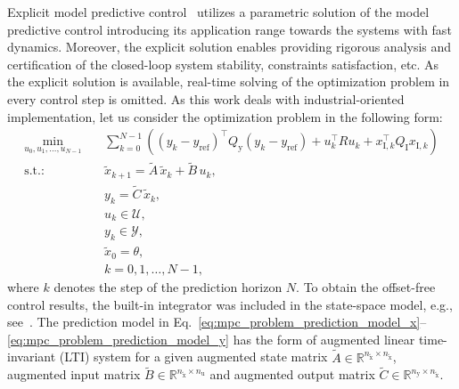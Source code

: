 \documentclass[preprint,12pt]{elsarticle}
\begin{document}
	Explicit model predictive control~\cite{Bemporad_automatica} utilizes a parametric solution of the model predictive control introducing its application range towards the systems with fast dynamics. Moreover, the explicit solution enables providing rigorous analysis and certification of the closed-loop system stability, constraints satisfaction, etc. As the explicit solution is available, real-time solving of the optimization problem in every control step is omitted. As this work deals with industrial-oriented implementation, let us consider the optimization problem in the following form:
	\begin{subequations}
		\label{eq:mpc_problem}
		\begin{eqnarray}
			\label{eq:mpc_problem_cost}
			\min_{u_0,u_{1},\ldots,u_{N-1}} &~& \! \sum_{k=0}^{N-1} \! \left( (y_k-y_\mathrm{ref})^{\intercal} Q_\mathrm{y} (y_k-y_\mathrm{ref}) + u_{k}^{\intercal} R u_{k} + x_{\mathrm{I},k}^{\intercal} Q_\mathrm{I} x_{\mathrm{I},k} \right)  \\
			\label{eq:mpc_problem_prediction_model_x}
			\mathrm{s.t.\!:} &~& \widetilde{x}_{k+1} = \widetilde{A}\,\widetilde{x}_{k} + \widetilde{B}\,u_{k}, \\
			\label{eq:mpc_problem_prediction_model_y}
			&~& y_{k} = \widetilde{C}\,\widetilde{x}_{k}, \\
			\label{eq:mpc_problem_input_constraints}
			&~& u_{k} \in \mathcal{U}, \\
			\label{eq:mpc_problem_state_constraints}
			&~& y_{k} \in \mathcal{Y}, \\
			\label{eq:mpc_problem_initial_coindition}
			&~& \widetilde{x}_{0} = \theta, \\
			\label{eq:mpc_problem_k_range}
			&~& k = 0,1,\ldots, N-1,
		\end{eqnarray}
	\end{subequations}
	where $k$ denotes the step of the prediction horizon $N$. 
	To obtain the offset-free control results, the built-in integrator was included in the state-space model, e.g., see~\cite{Ruscio_MPC_integral}. 
	The prediction model in Eq.~\eqref{eq:mpc_problem_prediction_model_x}--\eqref{eq:mpc_problem_prediction_model_y} has the form of augmented linear time-invariant (LTI) system for a given augmented state matrix $\widetilde{A} \in \mathbb{R}^{n_{\widetilde{\mathrm{x}}} \times n_{\widetilde{\mathrm{x}}}}$, augmented input matrix $\widetilde{B} \in \mathbb{R}^{n_{\widetilde{\mathrm{x}}} \times n_{\mathrm{u}}}$ and augmented output matrix $\widetilde{C} \in \mathbb{R}^{n_{\mathrm{y}} \times n_{\widetilde{\mathrm{x}}}}$. 
\end{document}
